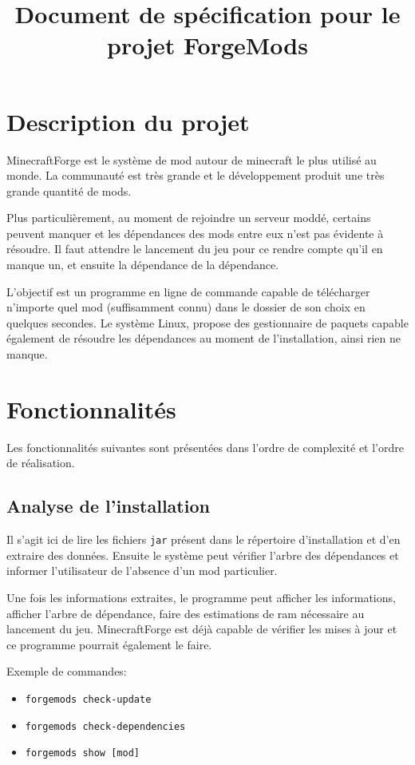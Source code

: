 \documentclass{article}
\title{Document de spécification pour le projet ForgeMods}
\begin{document}
\maketitle
\tableofcontents

\section{Description du projet}
MinecraftForge est le système de mod autour de minecraft le plus utilisé au monde.
La communauté est très grande et le développement produit une très grande quantité de mods.

Plus particulièrement, au moment de rejoindre un serveur moddé, certains peuvent manquer et les dépendances des mods entre eux n'est pas évidente à résoudre.
Il faut attendre le lancement du jeu pour ce rendre compte qu'il en manque un, et ensuite la dépendance de la dépendance.

L'objectif est un programme en ligne de commande capable de télécharger n'importe quel mod (suffisamment connu) dans le dossier de son choix en quelques secondes.
Le système Linux, propose des gestionnaire de paquets capable également de résoudre les dépendances au moment de l'installation, ainsi rien ne manque.

\section{Fonctionnalités}
Les fonctionnalités suivantes sont présentées dans l'ordre de complexité et l'ordre de réalisation.

\subsection{Analyse de l'installation}
Il s'agit ici de lire les fichiers \texttt{jar} présent dans le répertoire d'installation et d'en extraire des données.
Ensuite le système peut vérifier l'arbre des dépendances et informer l'utilisateur de l'absence d'un mod particulier.

Une fois les informations extraites, le programme peut afficher les informations, afficher l'arbre de dépendance, faire des estimations de ram nécessaire au lancement du jeu.
MinecraftForge est déjà capable de vérifier les mises à jour et ce programme pourrait également le faire.

\medskip\noindent
Exemple de commandes:
\begin{itemize}
\item \texttt{forgemods check-update}
\item \texttt{forgemods check-dependencies}
\item \texttt{forgemods show [mod]}
\end{itemize}
\end{document}
